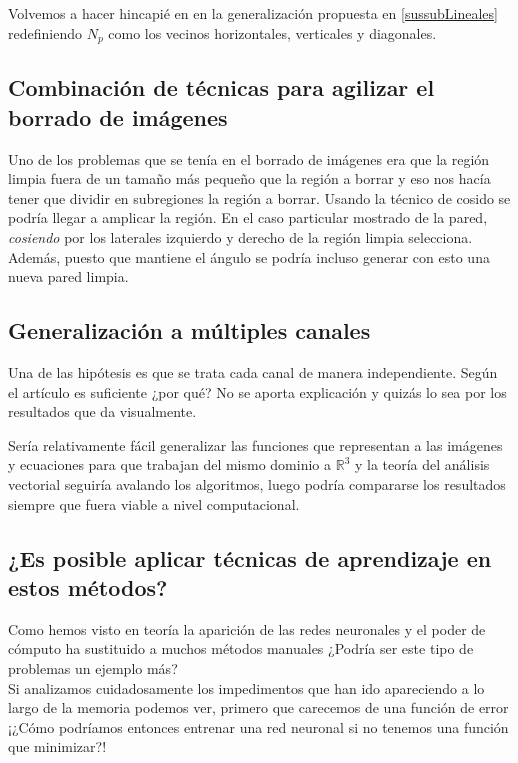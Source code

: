 \documentclass[11pt,twoside,titlepage,a4paper]{article}
\numberwithin{equation}{section} %
\theoremstyle{usual}
\begin{document}
Volvemos a hacer hincapié en en la generalización propuesta en \ref{sussubLineales} redefiniendo $N_p$ como los vecinos horizontales, verticales y diagonales. 

\subsection{Combinación de técnicas para agilizar el borrado de imágenes}

Uno de los problemas que se tenía en el borrado de imágenes era que la región limpia fuera de un tamaño más pequeño que la región a borrar y eso nos hacía tener que dividir en subregiones la región a borrar.  
Usando la técnico de cosido se podría llegar a amplicar la región. En el caso particular mostrado de la pared, \textit{cosiendo} por los laterales izquierdo y derecho de la región limpia selecciona.  
Además, puesto que mantiene el ángulo se podría incluso generar con esto una nueva pared limpia. 

\subsection{Generalización a múltiples canales }

Una de las hipótesis es que se trata cada canal de manera independiente.  Según el artículo es suficiente \cite{poissonImageEditing} ¿por qué? No se aporta explicación y quizás lo sea por los resultados que da visualmente. 

Sería relativamente fácil generalizar las funciones que representan a las imágenes y ecuaciones para que trabajan del mismo dominio a $\mathbb R^3$ y la teoría del análisis vectorial seguiría avalando los algoritmos, luego podría compararse los resultados siempre que fuera viable a nivel computacional. 


\subsection{¿Es posible aplicar técnicas de aprendizaje en estos métodos?} 

Como hemos visto en teoría la aparición de las redes neuronales y el poder de cómputo ha sustituido a muchos métodos manuales ¿Podría ser este tipo de problemas un ejemplo más?  
\\

Si analizamos cuidadosamente los impedimentos que han ido apareciendo a lo largo de la memoria podemos ver, primero que carecemos de una función de error ¡¿Cómo podríamos entonces entrenar una red neuronal si no tenemos una función que minimizar?!  
\\
\end{document}
